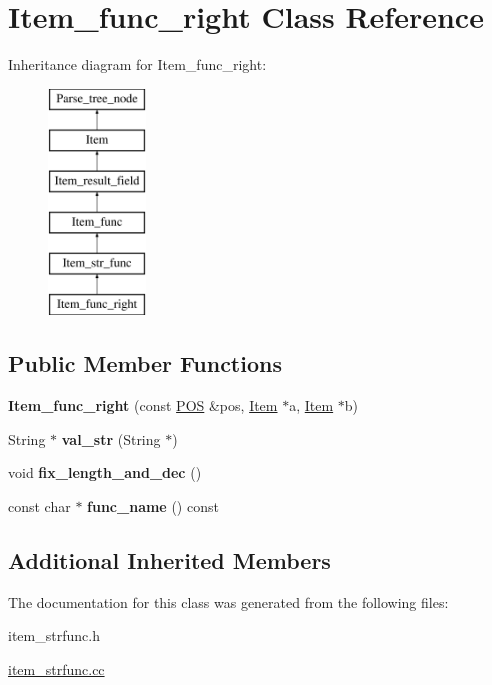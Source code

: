 \hypertarget{classItem__func__right}{}\section{Item\+\_\+func\+\_\+right Class Reference}
\label{classItem__func__right}
Inheritance diagram for Item\+\_\+func\+\_\+right\+:\begin{figure}[H]
\begin{center}
\leavevmode
\includegraphics[height=6.000000cm]{classItem__func__right}
\end{center}
\end{figure}
\subsection*{Public Member Functions}
\begin{DoxyCompactItemize}
\item 
\mbox{\label{classItem__func__right_a78a8f5a413603c37392c34da6abd0b34}} 
{\bfseries Item\+\_\+func\+\_\+right} (const \mbox{\hyperlink{structYYLTYPE}{P\+OS}} \&pos, \mbox{\hyperlink{classItem}{Item}} $\ast$a, \mbox{\hyperlink{classItem}{Item}} $\ast$b)
\item 
\mbox{\label{classItem__func__right_ad882496fe4d0920e4ad30cec0d392b34}} 
String $\ast$ {\bfseries val\+\_\+str} (String $\ast$)
\item 
\mbox{\label{classItem__func__right_aed72848917fb58d6664ac28a74881e79}} 
void {\bfseries fix\+\_\+length\+\_\+and\+\_\+dec} ()
\item 
\mbox{\label{classItem__func__right_a3ab31d528c712bffd0850b717f435f58}} 
const char $\ast$ {\bfseries func\+\_\+name} () const
\end{DoxyCompactItemize}
\subsection*{Additional Inherited Members}


The documentation for this class was generated from the following files\+:\begin{DoxyCompactItemize}
\item 
item\+\_\+strfunc.\+h\item 
\mbox{\hyperlink{item__strfunc_8cc}{item\+\_\+strfunc.\+cc}}\end{DoxyCompactItemize}
